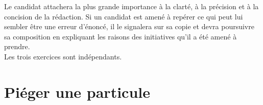 \documentclass[12pt,french,twoside]{exam}
\begin{document}


\begin{center}
{\setlength{\fboxrule}{0.3mm}
}
\end{center}
\vspace{0.2cm}
\begin{tcolorbox}[title = Quelques consignes]
Le candidat attachera la plus grande importance à la clarté, à la précision et à la concision de la rédaction. Si un candidat est amené à repérer ce qui peut lui sembler être une erreur d'énoncé, il le signalera sur sa copie et devra poursuivre sa composition en expliquant les raisons des initiatives qu'il a été amené à prendre.\\

Les trois exercices sont indépendants.
\end{tcolorbox}



\part*{Piéger une particule}
\end{document}
